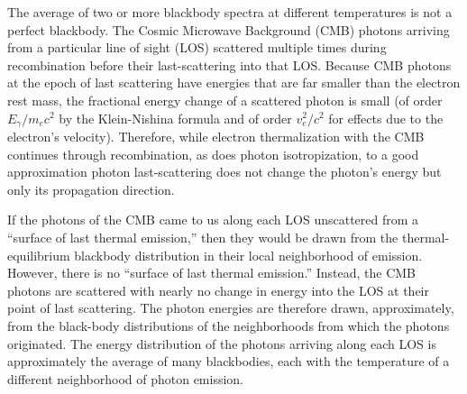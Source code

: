 \documentclass[fleqn,usenatbib]{mnras}
\begin{document}
    The average of two or more blackbody spectra at different temperatures is
    not a perfect blackbody.  The Cosmic Microwave Background (CMB) photons
    arriving from a particular line of sight (LOS) scattered multiple times
    during recombination before their last-scattering into that LOS.  Because
    CMB photons at the epoch of last scattering have energies that are far
    smaller than the electron rest mass, the fractional energy change of a
    scattered photon is small (of order $E_\gamma / m_e c^2$ by the
    Klein-Nishina formula \citep[as translated in
    \cite{KleinNishina1994}]{KleinNishina1929} and of order $v_e^2/c^2$ for
    effects due to the electron's velocity).  Therefore, while electron
    thermalization with the CMB continues through recombination, as does photon
    isotropization, to a good approximation photon last-scattering does not
    change the photon's energy but only its propagation direction.

    If the photons of the CMB came to us along each LOS unscattered from a
    ``surface of last thermal emission,'' then they would be drawn from the
    thermal-equilibrium blackbody distribution in their local neighborhood of
    emission. However, there is no ``surface of last thermal emission.''
    Instead, the CMB photons are scattered with nearly no change in energy into
    the LOS at their point of last scattering.  The photon energies are
    therefore drawn, approximately, from the black-body distributions of the
    neighborhoods from which the photons originated.  The energy distribution of
    the photons arriving along each LOS is approximately the average of many
    blackbodies, each with the temperature of a different neighborhood of photon
    emission.
\end{document}
